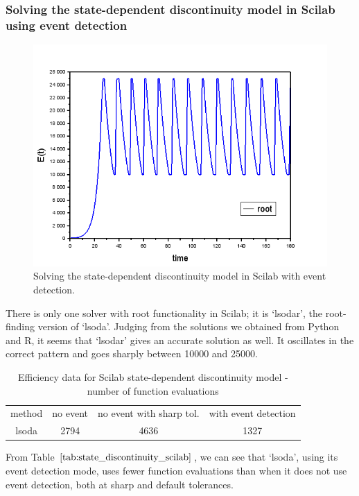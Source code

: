 \subsubsection{Solving the state-dependent discontinuity model in Scilab using event detection}
\begin{figure}[H]
\centering
\includegraphics[width=0.7\linewidth]{./figures/solve_state_discontinuity_scilab}
\caption{Solving the state-dependent discontinuity model in Scilab with event detection.}
\label{fig:solve_state_discontinuity_scilab}
\end{figure}
There is only one solver with root functionality in Scilab; it is `lsodar', the root-finding version of `lsoda'. Judging from the solutions we obtained from Python and R, it seems that `lsodar' gives an accurate solution as well. It oscillates in the correct pattern and goes sharply between 10000 and 25000.

\begin{table}[h]
\caption {Efficiency data for Scilab state-dependent discontinuity model - number of function evaluations} \label{tab:state_discontinuity_scilab}
\begin{center}
\begin{tabular}{ c c c c } 
method & no event & no event with sharp tol. & with event detection \\ 
lsoda & 2794 & 4636 & 1327 \\
\end{tabular}
\end{center}
\end{table}

From Table $\ref{tab:state_discontinuity_scilab}$, we can see that `lsoda', using its event detection mode, uses fewer function evaluations 
than when it does not use event detection, both at sharp and default tolerances.

